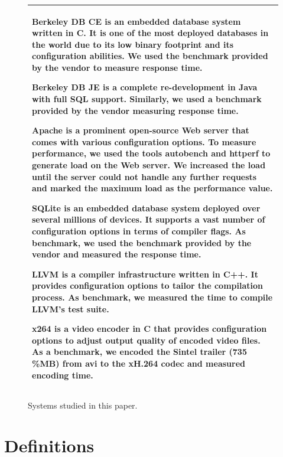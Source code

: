 \documentclass{sig-alternative}
\begin{document}
\begin{figure}[!hb]\small
\begin{tabular}{|p{.95\linewidth}|}\hline
\textbf{Berkeley DB CE} is an embedded database system written in C. It is one of the most deployed databases in the world due to its low binary footprint and its configuration abilities. We used the benchmark provided by the vendor to measure response time.

\textbf{Berkeley DB JE} is a complete re-development in Java with full SQL support. Similarly, we used a benchmark provided by the vendor measuring response time.

\textbf{Apache} is a prominent open-source Web server that comes with various configuration options. To measure performance, we used the tools autobench and httperf to generate load on the Web server. We increased the load until the server could not handle any further requests and marked the maximum load as the performance value.

\textbf{SQLite} is an embedded database system deployed over several millions of devices. It supports a vast number of configuration options in terms of compiler flags. As benchmark, we used the benchmark provided by the vendor and measured the response time.

\textbf{LLVM} is a compiler infrastructure written in C++. It provides configuration options to tailor the compilation process. As benchmark, we measured the time to compile LLVM's test suite.

\textbf{x264} is a video encoder in C that provides configuration options to adjust output quality of encoded video files. As a benchmark, we encoded the Sintel trailer (735\,\%MB) from avi to the xH.264 codec and measured encoding time.\\\hline
\end{tabular}
\caption{Systems studied in this paper.}\label{fig:systems}
\end{figure}


\section{Definitions}
\end{document}
